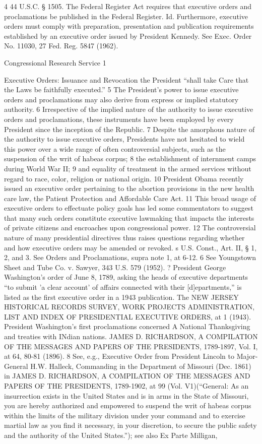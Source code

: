 \documentclass[11pt,a4paper]{article}
\begin{document}
4 44 U.S.C. § 1505. The Federal Register Act requires that executive orders and proclamations be published in the Federal Register. Id. Furthermore, executive orders must comply with preparation, presentation and publication requirements established by an executive order issued by President Kennedy. See Exec. Order No. 11030, 27 Fed. Reg. 5847 (1962).

Congressional Research Service 1

Executive Orders: Issuance and Revocation the President “shall take Care that the Laws be faithfully executed.” 5 The President's power to issue executive orders and proclamations may also derive from express or implied statutory authority. 6 Irrespective of the implied nature of the authority to issue executive orders and proclamations, these instruments have been employed by every President since the inception of the Republic. 7 Despite the amorphous nature of the authority to issue executive orders, Presidents have not hesitated to wield this power over a wide range of often controversial subjects, such as the suspension of the writ of habeas corpus; 8 the establishment of internment camps during World War II; 9 and equality of treatment in the armed services without regard to race, color, religion or national origin. 10 President Obama recently issued an executive order pertaining to the abortion provisions in the new health care law, the Patient Protection and Affordable Care Act. 11 This broad usage of executive orders to effectuate policy goals has led some commentators to suggest that many such orders constitute executive lawmaking that impacts the interests of private citizens and encroaches upon congressional power. 12 The controversial nature of many presidential directives thus raises questions regarding whether and how executive orders may be amended or revoked. s U.S. Const., Art. II, § 1, 2, and 3. See Orders and Proclamations, supra note 1, at 6-12. 6 See Youngstown Sheet and Tube Co. v. Sawyer, 343 U.S. 579 (1952). ? President George Washington's order of June 8, 1789, asking the heads of executive departments “to submit 'a clear account' of affairs connected with their [d]epartments,” is listed as the first executive order in a 1943 publication. The NEW JERSEY HISTORICAL RECORDS SURVEY, WORK PROJECTS ADMINISTRATION, LIST AND INDEX OF PRESIDENTIAL EXECUTIVE ORDERS, at 1 (1943). President Washington's first proclamations concerned A National Thanksgiving and treaties with INdian nations. JAMES D. RICHARDSON, A COMPILATION OF THE MESSAGES AND PAPERS OF THE PRESIDENTS, 1789-1897, Vol. I, at 64, 80-81 (1896). 8 See, e.g., Executive Order from President Lincoln to Major-General H.W. Halleck, Commanding in the Department of Missouri (Dec. 1861) in JAMES D. RICHARDSON, A COMPILATION OF THE MESSAGES AND PAPERS OF THE PRESIDENTS, 1789-1902, at 99 (Vol. V1)(“General: As an insurrection exists in the United States and is in arms in the State of Missouri, you are hereby authorized and empowered to suspend the writ of habeas corpus within the limits of the military division under your command and to exercise martial law as you find it necessary, in your discretion, to secure the public safety and the authority of the United States.”); see also Ex Parte Milligan, 
\end{document}
